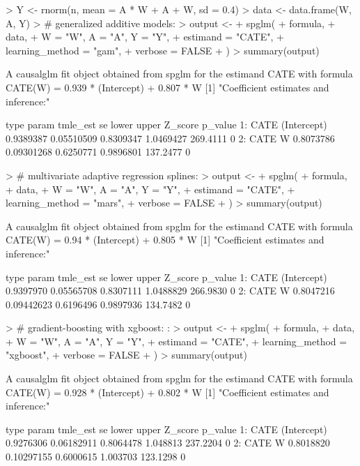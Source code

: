 \documentclass{article}
\begin{document}
\begin{Schunk}
\begin{Sinput}
> Y <- rnorm(n, mean = A * W + A + W, sd = 0.4)
> data <- data.frame(W, A, Y)
> # generalized additive models:
> output <-
+   spglm(
+     formula,
+     data,
+     W = "W", A = "A", Y = "Y",
+     estimand = "CATE",
+     learning_method = "gam",
+     verbose = FALSE
+   )
> summary(output)
\end{Sinput}
\begin{Soutput}
A causalglm fit object obtained from spglm for the estimand CATE with formula 
CATE(W) = 0.939 * (Intercept) + 0.807 * W
[1] "Coefficient estimates and inference:"

   type       param  tmle_est         se     lower     upper  Z_score p_value
1: CATE (Intercept) 0.9389387 0.05510509 0.8309347 1.0469427 269.4111       0
2: CATE           W 0.8073786 0.09301268 0.6250771 0.9896801 137.2477       0
\end{Soutput}
\begin{Sinput}
> # multivariate adaptive regression splines:
> output <-
+   spglm(
+     formula,
+     data,
+     W = "W", A = "A", Y = "Y",
+     estimand = "CATE",
+     learning_method = "mars",
+     verbose = FALSE
+   )
> summary(output)
\end{Sinput}
\begin{Soutput}
A causalglm fit object obtained from spglm for the estimand CATE with formula 
CATE(W) = 0.94 * (Intercept) + 0.805 * W
[1] "Coefficient estimates and inference:"

   type       param  tmle_est         se     lower     upper  Z_score p_value
1: CATE (Intercept) 0.9397970 0.05565708 0.8307111 1.0488829 266.9830       0
2: CATE           W 0.8047216 0.09442623 0.6196496 0.9897936 134.7482       0
\end{Soutput}
\begin{Sinput}
> # gradient-boosting with xgboost: :
> output <-
+   spglm(
+     formula,
+     data,
+     W = "W", A = "A", Y = "Y",
+     estimand = "CATE",
+     learning_method = "xgboost",
+     verbose = FALSE
+   )
> summary(output)
\end{Sinput}
\begin{Soutput}
A causalglm fit object obtained from spglm for the estimand CATE with formula 
CATE(W) = 0.928 * (Intercept) + 0.802 * W
[1] "Coefficient estimates and inference:"

   type       param  tmle_est         se     lower    upper  Z_score p_value
1: CATE (Intercept) 0.9276306 0.06182911 0.8064478 1.048813 237.2204       0
2: CATE           W 0.8018820 0.10297155 0.6000615 1.003703 123.1298       0
\end{Soutput}
\end{Schunk}
\end{document}
